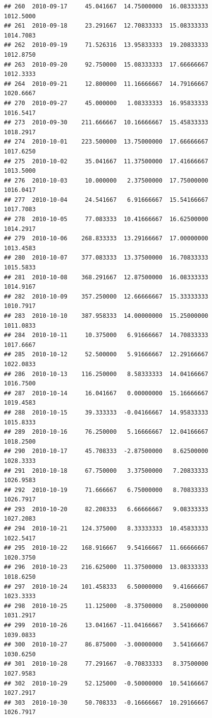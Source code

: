 \documentclass[
]{article}
\begin{document}
\begin{verbatim}
## 260  2010-09-17     45.041667  14.75000000  16.08333333    1012.5000
## 261  2010-09-18     23.291667  12.70833333  15.08333333    1014.7083
## 262  2010-09-19     71.526316  13.95833333  19.20833333    1012.8750
## 263  2010-09-20     92.750000  15.08333333  17.66666667    1012.3333
## 264  2010-09-21     12.800000  11.16666667  14.79166667    1020.6667
## 270  2010-09-27     45.000000   1.08333333  16.95833333    1016.5417
## 273  2010-09-30    211.666667  10.16666667  15.45833333    1018.2917
## 274  2010-10-01    223.500000  13.75000000  17.66666667    1017.6250
## 275  2010-10-02     35.041667  11.37500000  17.41666667    1013.5000
## 276  2010-10-03     10.000000   2.37500000  17.75000000    1016.0417
## 277  2010-10-04     24.541667   6.91666667  15.54166667    1017.7083
## 278  2010-10-05     77.083333  10.41666667  16.62500000    1014.2917
## 279  2010-10-06    268.833333  13.29166667  17.00000000    1013.4583
## 280  2010-10-07    377.083333  13.37500000  16.70833333    1015.5833
## 281  2010-10-08    368.291667  12.87500000  16.08333333    1014.9167
## 282  2010-10-09    357.250000  12.66666667  15.33333333    1010.7917
## 283  2010-10-10    387.958333  14.00000000  15.25000000    1011.0833
## 284  2010-10-11     10.375000   6.91666667  14.70833333    1017.6667
## 285  2010-10-12     52.500000   5.91666667  12.29166667    1022.0833
## 286  2010-10-13    116.250000   8.58333333  14.04166667    1016.7500
## 287  2010-10-14     16.041667   0.00000000  15.16666667    1019.4583
## 288  2010-10-15     39.333333  -0.04166667  14.95833333    1015.8333
## 289  2010-10-16     76.250000   5.16666667  12.04166667    1018.2500
## 290  2010-10-17     45.708333  -2.87500000   8.62500000    1028.3333
## 291  2010-10-18     67.750000   3.37500000   7.20833333    1026.9583
## 292  2010-10-19     71.666667   6.75000000   8.70833333    1026.7917
## 293  2010-10-20     82.208333   6.66666667   9.08333333    1027.2083
## 294  2010-10-21    124.375000   8.33333333  10.45833333    1022.5417
## 295  2010-10-22    168.916667   9.54166667  11.66666667    1020.3750
## 296  2010-10-23    216.625000  11.37500000  13.08333333    1018.6250
## 297  2010-10-24    101.458333   6.50000000   9.41666667    1023.3333
## 298  2010-10-25     11.125000  -8.37500000   8.25000000    1031.2917
## 299  2010-10-26     13.041667 -11.04166667   3.54166667    1039.0833
## 300  2010-10-27     86.875000  -3.00000000   3.54166667    1030.6250
## 301  2010-10-28     77.291667  -0.70833333   8.37500000    1027.9583
## 302  2010-10-29     52.125000  -0.50000000  10.54166667    1027.2917
## 303  2010-10-30     50.708333  -0.16666667  10.29166667    1026.7917

\end{verbatim}
\end{document}
